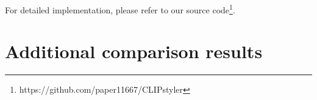 \documentclass[10pt,twocolumn,letterpaper]{article}
\begin{document}
For detailed implementation, please refer to our source code\footnote{https://github.com/paper11667/CLIPstyler}.


\section{Additional comparison results}
      
\end{document}
